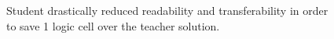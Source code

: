
\begin{figure}[t]
    \centering
    \inputminted[frame=single]{systemverilog}{code/unreadable_opt.svh}
    \caption{Student drastically reduced readability and transferability in order to save 1 logic cell over the teacher solution.}
    \label{fig:unreadable_opt}
\end{figure}
